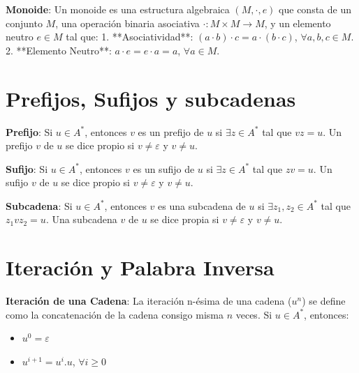 \documentclass[12pt]{report} %
\begin{document}
\begin{definicion}
\textbf{Monoide}: Un monoide es una estructura algebraica $(M, \cdot, e)$ que consta de un conjunto $M$, una operación binaria asociativa $\cdot : M \times M \to M$, y un elemento neutro $e \in M$ tal que:  
1. **Asociatividad**: $(a \cdot b) \cdot c = a \cdot (b \cdot c)$, $\forall a, b, c \in M$.  
2. **Elemento Neutro**: $a \cdot e = e \cdot a = a$, $\forall a \in M$.  
\end{definicion}

\hypertarget{prefijos-sufijos-y-subcadenas}{%
\section{Prefijos, Sufijos y
subcadenas}\label{prefijos-sufijos-y-subcadenas}}

\begin{definicion}
\textbf{Prefijo}: Si $u \in A^*$, entonces $v$ es un prefijo de $u$ si $\exists z \in A^*$ tal que $vz = u$.  
Un prefijo $v$ de $u$ se dice propio si $v \neq \varepsilon$ y $v \neq u$.  
\end{definicion}

\begin{definicion}
\textbf{Sufijo}: Si $u \in A^*$, entonces $v$ es un sufijo de $u$ si $\exists z \in A^*$ tal que $zv = u$.  
Un sufijo $v$ de $u$ se dice propio si $v \neq \varepsilon$ y $v \neq u$.  
\end{definicion}

\begin{definicion}
\textbf{Subcadena}: Si $u \in A^*$, entonces $v$ es una subcadena de $u$ si $\exists z_1, z_2 \in A^*$ tal que $z_1vz_2 = u$.  
Una subcadena $v$ de $u$ se dice propia si $v \neq \varepsilon$ y $v \neq u$.  
\end{definicion}

\hypertarget{iteraciuxf3n-y-palabra-inversa}{%
\section{Iteración y Palabra
Inversa}\label{iteraciuxf3n-y-palabra-inversa}}

\begin{definicion}
\textbf{Iteración de una Cadena}: La iteración n-ésima de una cadena ($u^n$) se define como la concatenación de la cadena consigo misma $n$ veces.  
Si $u \in A^*$, entonces:  
\begin{itemize}
    \item $u^0 = \varepsilon$  
    \item $u^{i+1} = u^i.u$, $\forall i \geq 0$  
\end{itemize}
\end{definicion}
\end{document}
